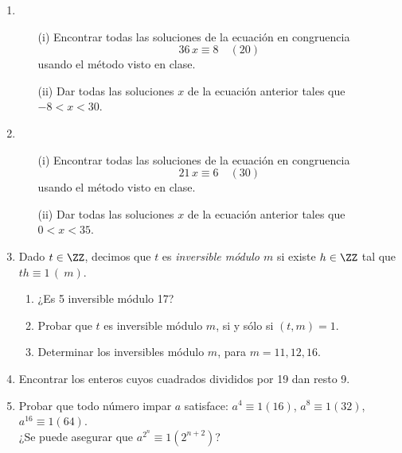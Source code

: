 \documentclass[12pt,spanish,makeidx]{amsbook}
\begin{document}
\begin{enumerate}
\smallskip
\item 
\begin{enumerate}
	\item[(i)] Encontrar todas las soluciones de la ecuaci\'on en congruencia
	$$36\,x\equiv 8 \quad (20)$$
	usando el método visto en clase.
	\item[(ii)] Dar todas las soluciones $x$ de la ecuaci\'on anterior tales que $-8 < x < 30$.
\end{enumerate}


\smallskip
\item 
\begin{enumerate}
\item[(i)] Encontrar todas las soluciones de la ecuaci\'on en congruencia
$$21\,x\equiv 6 \quad (30)$$
usando el método visto en clase.
\item[(ii)] Dar todas las soluciones $x$ de la ecuaci\'on anterior tales que $0 < x < 35$.
\end{enumerate}





\smallskip
\item Dado $t \in {\ZZ}$, decimos que $t$ es {\it inversible m\'odulo $m$} si existe $h \in {\ZZ}$ tal que $th\equiv 1\,(\ m)$.
  \begin{enumerate}
  \item ¿Es 5 inversible m\'odulo 17?
  \item Probar que $t$ es inversible m\'odulo $m$, si y s\'olo si $(t,m)=1$.
  \item Determinar los inversibles m\'odulo $m$, para $m=11,12,16$.
  \end{enumerate}




\smallskip
\item Encontrar los enteros cuyos cuadrados divididos por 19 dan resto 9.

\smallskip

\item Probar que todo n\'umero impar $a$ satisface: $a^4 \equiv 1(16)$, $a^8 \equiv 1(32)$, $a^{16}\equiv 1(64)$.\\ ¿Se puede asegurar que $a^{2^n} \equiv 1 (2^{n+2})$?


\end{enumerate}
\end{document}
